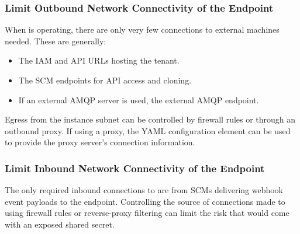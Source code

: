 \subsubsection{Limit Outbound Network Connectivity of the \cxoneflowtext\space Endpoint}

When \cxoneflow is operating, there are only very few connections to external machines
needed.  These are generally:

\begin{itemize}
  \item The IAM and API URLs hosting the \cxone tenant.
  \item The SCM endpoints for API access and cloning.
  \item If an external AMQP server is used, the external AMQP endpoint.
\end{itemize}

Egress from the \cxoneflow instance subnet can be controlled by firewall rules or
through an outbound proxy.  If using a proxy, the 
YAML configuration element can be used to provide the proxy server's connection information.

\subsubsection{Limit Inbound Network Connectivity of the \cxoneflowtext\space Endpoint}

The only required inbound connections to \cxoneflow are from SCMs delivering webhook event
payloads to the \cxoneflow endpoint.  Controlling the source of connections made to \cxoneflow using firewall rules
or reverse-proxy filtering can limit the risk that would come with an exposed shared secret.

